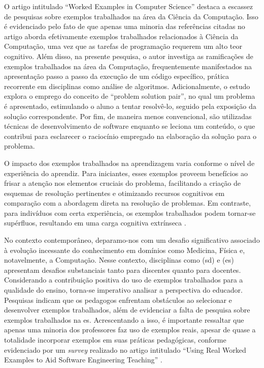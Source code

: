 O artigo intitulado ``Worked Examples in Computer Science'' \cite{Skudder-LuxtonReilly:2014} destaca a escassez de pesquisas sobre exemplos trabalhados na área da Ciência da Computação. Isso é evidenciado pelo fato de que apenas uma minoria das referências citadas no artigo aborda efetivamente exemplos trabalhados relacionados à Ciência da Computação, uma vez que as tarefas de programação requerem um alto teor cognitivo. Além disso, na presente pesquisa, o autor investiga as ramificações de exemplos trabalhados na área da Computação, frequentemente manifestados na apresentação passo a passo da execução de um código específico, prática recorrente em disciplinas como análise de algoritmos. Adicionalmente, o estudo explora o emprego do conceito de ``problem solution pair'', no qual um problema é apresentado, estimulando o aluno a tentar resolvê-lo, seguido pela exposição da solução correspondente. Por fim, de maneira menos convencional, são utilizadas técnicas de desenvolvimento de software enquanto se leciona um conteúdo, o que contribui para esclarecer o raciocínio empregado na elaboração da solução para o problema.

O impacto dos exemplos trabalhados na aprendizagem varia conforme o nível de experiência do aprendiz. Para iniciantes, esses exemplos proveem benefícios ao frisar a atenção nos elementos cruciais do problema, facilitando a criação de esquemas de resolução pertinentes e otimizando recursos cognitivos em comparação com a abordagem direta na resolução de problemas. Em contraste, para indivíduos com certa experiência, os exemplos trabalhados podem tornar-se supérfluos, resultando em uma carga cognitiva extrínseca \cite{Skudder-LuxtonReilly:2014}.

No contexto contemporâneo, deparamo-nos com um desafio significativo associado à evolução incessante do conhecimento em domínios como Medicina, Física e, notavelmente, a Computação. Nesse contexto, disciplinas como (\gls{sd}) e (\gls{es}) apresentam desafios substanciais tanto para discentes quanto para docentes. Considerando a contribuição positiva do uso de exemplos trabalhados para a qualidade do ensino, torna-se imperativo analisar a perspectiva do educador. Pesquisas indicam que os pedagogos enfrentam obstáculos ao selecionar e desenvolver exemplos trabalhados, além de evidenciar a falta de pesquisa sobre exemplos trabalhados na \gls{es}. Acrescentando a isso, é importante ressaltar que apenas uma minoria dos professores faz uso de exemplos reais, apesar de quase a totalidade incorporar exemplos em suas práticas pedagógicas, conforme evidenciado por um \textit{survey} realizado no artigo intitulado ``Using Real Worked Examples to Aid Software Engineering Teaching'' \cite{Simone.Tonhao-etal:2021}.


